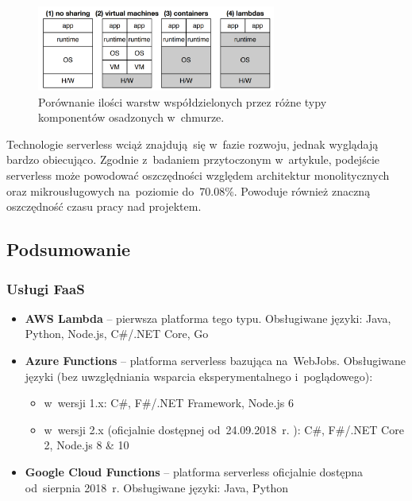 \documentclass[12pt,a4paper,twoside,titlepage,openright]{book}
\begin{document}
\begin{figure}[h]
	\centering
			\includegraphics[width=0.7\textwidth]{serverlessSharing.png}
		\caption{Porównanie ilości warstw współdzielonych przez różne typy komponentów osadzonych w~chmurze. \cite{openLambdaArticle}}
		\label{fig:serverlessSharing}
\end{figure}

Technologie serverless wciąż znajdują~się w~fazie rozwoju, jednak wyglądają bardzo obiecująco. Zgodnie z~badaniem przytoczonym w~artykule\cite{serverlessArticle}, podejście serverless może powodować oszczędności względem architektur monolitycznych oraz mikrousługowych na~poziomie do~70.08\%. Powoduje również znaczną oszczędność czasu pracy nad projektem.\cite{serverlessMaddie}

\subsection*{Podsumowanie}

\subsubsection{Usługi FaaS}

\begin{itemize}
\item \textbf{AWS Lambda} -- pierwsza platforma tego typu. Obsługiwane języki: Java, Python, Node.js, C\#/.NET Core, Go
\item \textbf{Azure Functions} -- platforma serverless bazująca na~WebJobs. Obsługiwane języki (bez uwzględniania wsparcia eksperymentalnego i~poglądowego):
	\begin{itemize}
		\item w~wersji 1.x: C\#, F\#/.NET Framework, Node.js 6
		\item w~wersji 2.x (oficjalnie dostępnej od~24.09.2018~r. \cite{siteAzureFunctions2}): C\#, F\#/.NET Core 2, Node.js 8 \& 10
	\end{itemize}
\item \textbf{Google Cloud Functions} -- platforma serverless oficjalnie dostępna od~sierpnia 2018~r. \cite{siteGoogleServerless} Obsługiwane języki: Java, Python
\end{itemize}
\end{document}
